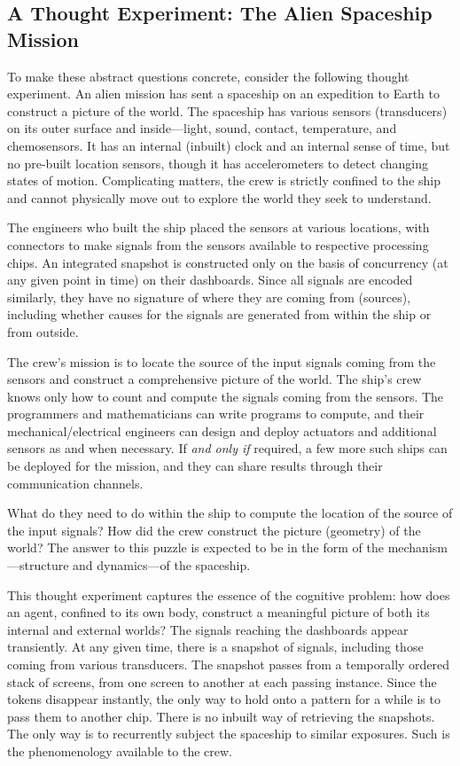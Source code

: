 \subsection{A Thought Experiment: The Alien Spaceship Mission}
To make these abstract questions concrete, consider the following thought experiment. An alien mission has sent a spaceship on an expedition to Earth to construct a picture of the world. The spaceship has various sensors (transducers) on its outer surface and inside—light, sound, contact, temperature, and chemosensors. It has an internal (inbuilt) clock and an internal sense of time, but no pre-built location sensors, though it has accelerometers to detect changing states of motion. Complicating matters, the crew is strictly confined to the ship and cannot physically move out to explore the world they seek to understand.

The engineers who built the ship placed the sensors at various locations, with connectors to make signals from the sensors available to respective processing chips. An integrated snapshot is constructed only on the basis of concurrency (at any given point in time) on their dashboards. Since all signals are encoded similarly, they have no signature of where they are coming from (sources), including whether causes for the signals are generated from within the ship or from outside.

The crew's mission is to locate the source of the input signals coming from the sensors and construct a comprehensive picture of the world. The ship's crew knows only how to count and compute the signals coming from the sensors. The programmers and mathematicians can write programs to compute, and their mechanical/electrical engineers can design and deploy actuators and additional sensors as and when necessary. If \textit{and only if} required, a few more such ships can be deployed for the mission, and they can share results through their communication channels.

What do they need to do within the ship to compute the location of the source of the input signals? How did the crew construct the picture (geometry) of the world? The answer to this puzzle is expected to be in the form of the mechanism—structure and dynamics—of the spaceship.

This thought experiment captures the essence of the cognitive problem: how does an agent, confined to its own body, construct a meaningful picture of both its internal and external worlds? The signals reaching the dashboards appear transiently. At any given time, there is a snapshot of signals, including those coming from various transducers. The snapshot passes from a temporally ordered stack of screens, from one screen to another at each passing instance. Since the tokens disappear instantly, the only way to hold onto a pattern for a while is to pass them to another chip. There is no inbuilt way of retrieving the snapshots. The only way is to recurrently subject the spaceship to similar exposures. Such is the phenomenology available to the crew.

